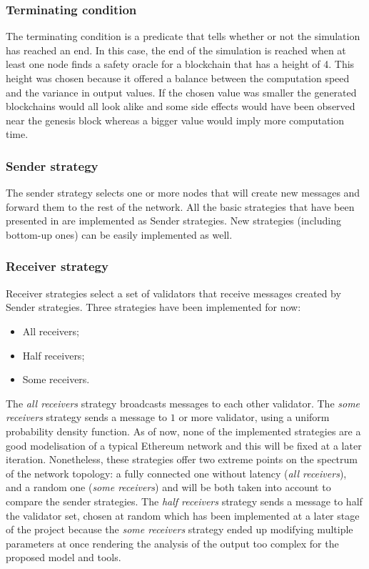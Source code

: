 \subsubsection{Terminating condition}
The terminating condition is a predicate that tells whether or not the simulation has
reached an end. In this case, the end of the simulation is reached when at least
one node finds a safety oracle for a blockchain that has a height of 4. This
height was chosen because it offered a balance between the computation speed and
the variance in output values. If the chosen value was smaller the generated
blockchains would all look alike and some side effects would have been observed
near the genesis block whereas a bigger value would imply more computation time.

\subsubsection{Sender strategy}
The sender strategy selects one or more nodes that will create new messages and
forward them to the rest of the network. All the basic strategies that have been
presented in  are implemented as Sender strategies.
New strategies (including bottom-up ones) can be easily implemented as well.

\subsubsection{Receiver strategy}
Receiver strategies select a set of validators that receive messages created by
Sender strategies. Three strategies have been implemented for now:
\begin{itemize}
        \item All receivers;
        \item Half receivers;
        \item Some receivers.
\end{itemize}

The \textit{all receivers} strategy broadcasts messages to each other validator.
The \textit{some receivers} strategy sends a message to \(1\) or more validator,
using a uniform probability density function.  As of now, none of the
implemented strategies are a good modelisation of a typical Ethereum network and
this will be fixed at a later iteration.  Nonetheless, these strategies offer
two extreme points on the spectrum of the network topology: a fully connected
one without latency (\textit{all receivers}), and a random one (\textit{some
receivers}) and will be both taken into account to compare the sender
strategies.
The \textit{half receivers} strategy sends a message to half the validator set,
chosen at random which has been implemented at a later stage of the project
because the \textit{some receivers} strategy ended up modifying multiple
parameters at once rendering the analysis of the output too complex for the
proposed model and tools.

